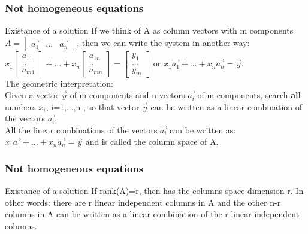 \begin{frame}
	\frametitle{Not homogeneous equations}
	\begin{block}{Existance of a solution}
		If we think of A as column vectors with m components $A=\begin{bmatrix} \overrightarrow{a_1} & ... & \overrightarrow{a_n} \end{bmatrix}$, then we can write the system in another way:\\
		$x_1\begin{bmatrix} a_{11} \\...\\a_{m1}\end{bmatrix} + ... + x_n \begin{bmatrix} a_{1n}\\...\\a_{mn} \end{bmatrix}= \begin{bmatrix}
		y_1\\...\\y_m
		\end{bmatrix}$ or $x_1\overrightarrow{a_1}+...+x_n\overrightarrow{a_n}=\overrightarrow{y}$. \\
		The geometric interpretation: \\
		Given a vector $\overrightarrow{y}$ of m components and n vectors $\overrightarrow{a_i}$ of m components, search {\bf all} numbers $x_i$, i=1,...,n , so that vector $\overrightarrow{y}$ can be written as a linear combination of the vectors $\overrightarrow{a_i}$.\\
		All the linear combinations of the vectors $\overrightarrow{a_i}$ can be written as: $x_1\overrightarrow{a_1}+...+x_n\overrightarrow{a_n}=\overrightarrow{y}$ and is called the column space of A. 
	\end{block}
\end{frame}

\begin{frame}
	\frametitle{Not homogeneous equations}
	\begin{block}{Existance of a solution}
		If rank(A)=r, then has the columns space dimension r. In other words: there are r linear independent columns in A and the other n-r columns in A can be written as a linear combination of the r linear independent columns. \\
	\end{block}
\end{frame}

